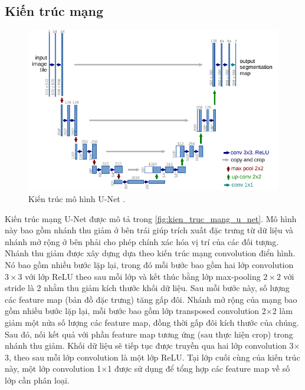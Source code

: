 \subsection{Kiến trúc mạng}
\label{subsec:kien_truc_mang_u_net}
	\begin{figure}[h!]
		\centering
		\includegraphics[width=0.9\linewidth]{figures/model_unet}
		\caption[Kiến trúc mô hình U-Net.]{Kiến trúc mô hình U-Net .}
		\label{fig:kien_truc_mang_u_net}
	\end{figure}
	Kiến trúc mạng U-Net được mô tả trong \autoref{fig:kien_truc_mang_u_net}. Mô hình này bao gồm nhánh thu giảm ở bên trái giúp trích xuất đặc trưng từ dữ liệu và nhánh mở rộng ở bên phải cho phép chính xác hóa vị trí của các đối tượng. Nhánh thu giảm được xây dựng dựa theo kiến trúc mạng convolution điển hình. Nó bao gồm nhiều bước lặp lại, trong đó mỗi bước bao gồm hai lớp convolution $3\times3$ với lớp ReLU theo sau mỗi lớp và kết thúc bằng lớp max-pooling $2\times2$ với stride là 2 nhằm thu giảm kích thước khối dữ liệu. Sau mỗi bước này, số lượng các feature map (bản đồ đặc trưng) tăng gấp đôi. Nhánh mở rộng của mạng bao gồm nhiều bước lặp lại, mỗi bước bao gồm lớp transposed convolution 2$\times$2 làm giảm một nửa số lượng các feature map, đồng thời gấp đôi kích thước của chúng. Sau đó, nối kết quả với phần feature map tương ứng (sau thực hiện crop) trong nhánh thu giảm. Khối dữ liệu sẽ tiếp tục được truyền qua hai lớp convolution 3$\times$3, theo sau mỗi lớp convolution là một lớp ReLU. Tại lớp cuối cùng của kiến trúc này, một lớp convolution 1$\times$1 được sử dụng để tổng hợp các feature map về số lớp cần phân loại.
	
